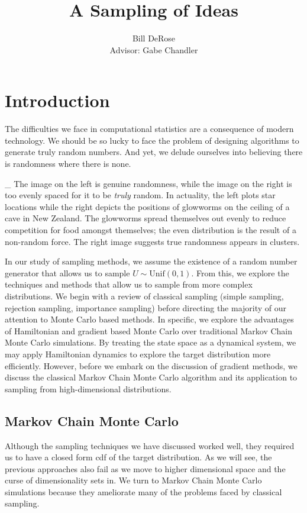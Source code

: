 \documentclass[11pt, oneside]{article}     %
\title{A Sampling of Ideas}
\author{Bill DeRose
\\ Advisor: Gabe Chandler}
\begin{document}

\maketitle
\section{Introduction}
The  difficulties we face in computational statistics are a consequence of modern technology.
We should be so lucky to face the problem of designing algorithms to generate truly random numbers. And yet, we delude ourselves into believing there is randomness where there is none.

_
The image on the left is genuine randomness, while the image on the right is too evenly spaced for it to be \emph{truly} random. In actuality, the left plots star locations while the right depicts the positions of glowworms on the ceiling of a cave in New Zealand. The glowworms spread themselves out evenly to reduce competition for food amongst themselves; the even distribution is the result of a non-random force. The right image suggests true randomness appears in clusters.

In our study of sampling methods, we assume the existence of a random
number generator that allows us to sample $U \sim \mbox{Unif}(0,1)$. From this, we explore
the techniques and methods that allow us to sample from more complex distributions. We begin with a
review of classical sampling (simple sampling, rejection sampling, importance sampling) before directing the majority of our attention to Monte Carlo based methods. In specific, we explore the advantages of Hamiltonian and gradient based Monte Carlo over traditional Markov Chain Monte Carlo simulations.
By treating the state space as a dynamical system, we may apply Hamiltonian dynamics to 
explore the target distribution more efficiently. However, before we embark on the discussion of gradient methods, we discuss the classical Markov Chain Monte Carlo algorithm and its application to sampling from high-dimensional distributions. 
\subsection{Markov Chain Monte Carlo}
Although the sampling techniques we have discussed worked well, they required us to 
have a closed form cdf of the target distribution. As we will see, the previous approaches also fail as we move to higher dimensional space and the curse of dimensionality sets in. We turn to Markov Chain Monte Carlo simulations because they ameliorate many of the problems faced by classical sampling.
\end{document}
